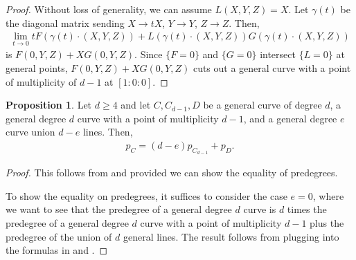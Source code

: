 \documentclass{article}
\theoremstyle{definition}
\newtheorem{prop}[thm]{Proposition}
\begin{document}
\begin{proof}
Without loss of generality, we can assume $L(X,Y,Z)=X$. Let $\gamma(t)$ be the diagonal matrix sending $X\to tX$, $Y\to Y$, $Z\to Z$. Then, \begin{align*}
    \lim_{t\to 0}tF(\gamma(t)\cdot (X,Y,Z))+L(\gamma(t)\cdot (X,Y,Z))G(\gamma(t)\cdot (X,Y,Z))
\end{align*}
is $F(0,Y,Z)+XG(0,Y,Z)$. Since $\{F=0\}$ and $\{G=0\}$ intersect $\{L=0\}$ at general points, $F(0,Y,Z)+XG(0,Y,Z)$ cuts out a general curve with a point of multiplicity of $d-1$ at $[1:0:0]$. 
\end{proof}

\begin{prop}
Let $d\geq 4$ and let $C, C_{d-1},D$ be a general curve of degree $d$, a general degree $d$ curve with a point of multiplicity $d-1$, and a general degree $e$ curve union $d-e$ lines. Then,
\begin{align*}
    p_C = (d-e)p_{C_{d-1}}+p_D.
\end{align*}
\end{prop}

\begin{proof}
This follows from  and  provided we can show the equality of predegrees. 

To show the equality on predegrees, it suffices to consider the case $e=0$, where we want to see that the predegree of a general degree $d$ curve is $d$ times the predegree of a general degree $d$ curve with a point of multiplicity $d-1$ plus the predegree of the union of $d$ general lines. The result follows from plugging into the formulas in \cite[Examples 3.1, 4.2]{AF00} and \cite{AF93}. 
\end{proof}

\begin{comment}
\begin{prop}
For each $C$ a smooth quartic plane curve with no hyperflexes (respectively a general quartic plane curve with an $A_n$ singularity for $3\leq n\leq 7$), the degree of its orbit closure is $14280=1785\cdot 8$ (respectively $14280-1785(n+1)$). 
\end{prop}

\begin{proof}
For a smooth quartic plane curve with no hyperflexes, see \cite{AF93}. See \cite[Example 5.4]{AF00} for the case of a quartic curve with an $A_n$ singularity.
\end{proof}
\end{comment}



\end{document}
